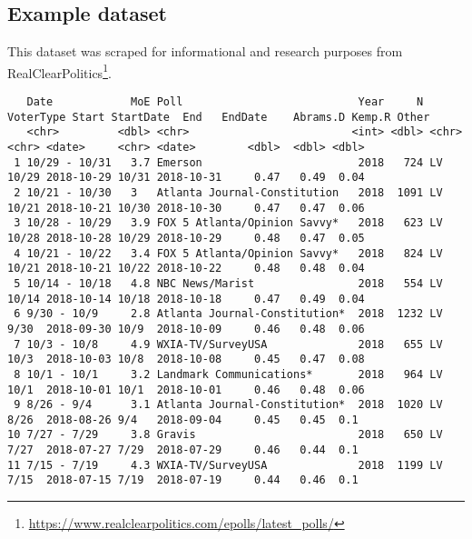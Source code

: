 \documentclass{article}
\renewcommand{\href}[2]{#2\footnote{\url{#1}}}
\begin{document}
\begin{landscape}

  \section{Example dataset}

  This dataset was scraped for informational and research purposes from 
  \href{https://www.realclearpolitics.com/epolls/latest_polls/}{RealClearPolitics}.
  {\footnotesize
\begin{verbatim}
   Date            MoE Poll                           Year     N VoterType Start StartDate  End   EndDate    Abrams.D Kemp.R Other
   <chr>         <dbl> <chr>                         <int> <dbl> <chr>     <chr> <date>     <chr> <date>        <dbl>  <dbl> <dbl>
 1 10/29 - 10/31   3.7 Emerson                        2018   724 LV        10/29 2018-10-29 10/31 2018-10-31     0.47   0.49  0.04
 2 10/21 - 10/30   3   Atlanta Journal-Constitution   2018  1091 LV        10/21 2018-10-21 10/30 2018-10-30     0.47   0.47  0.06
 3 10/28 - 10/29   3.9 FOX 5 Atlanta/Opinion Savvy*   2018   623 LV        10/28 2018-10-28 10/29 2018-10-29     0.48   0.47  0.05
 4 10/21 - 10/22   3.4 FOX 5 Atlanta/Opinion Savvy*   2018   824 LV        10/21 2018-10-21 10/22 2018-10-22     0.48   0.48  0.04
 5 10/14 - 10/18   4.8 NBC News/Marist                2018   554 LV        10/14 2018-10-14 10/18 2018-10-18     0.47   0.49  0.04
 6 9/30 - 10/9     2.8 Atlanta Journal-Constitution*  2018  1232 LV        9/30  2018-09-30 10/9  2018-10-09     0.46   0.48  0.06
 7 10/3 - 10/8     4.9 WXIA-TV/SurveyUSA              2018   655 LV        10/3  2018-10-03 10/8  2018-10-08     0.45   0.47  0.08
 8 10/1 - 10/1     3.2 Landmark Communications*       2018   964 LV        10/1  2018-10-01 10/1  2018-10-01     0.46   0.48  0.06
 9 8/26 - 9/4      3.1 Atlanta Journal-Constitution*  2018  1020 LV        8/26  2018-08-26 9/4   2018-09-04     0.45   0.45  0.1 
10 7/27 - 7/29     3.8 Gravis                         2018   650 LV        7/27  2018-07-27 7/29  2018-07-29     0.46   0.44  0.1 
11 7/15 - 7/19     4.3 WXIA-TV/SurveyUSA              2018  1199 LV        7/15  2018-07-15 7/19  2018-07-19     0.44   0.46  0.1 
\end{verbatim}
    }
\end{landscape}
\end{document}
